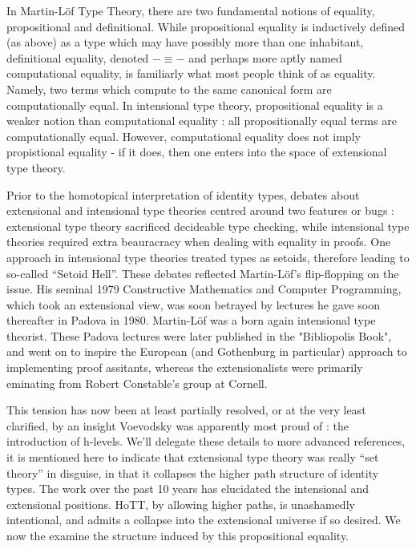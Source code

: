 In Martin-Löf Type Theory, there are two fundamental notions of equality,
propositional and definitional.  While propositional equality is inductively
defined (as above) as a type which may have possibly more than one inhabitant,
definitional equality, denoted $-\equiv -$ and perhaps more aptly named
computational equality, is familiarly what most people think of as equality.
Namely, two terms which compute to the same canonical form are computationally
equal. In intensional type theory, propositional equality is a weaker notion
than computational equality : all propositionally equal terms are
computationally equal. However, computational equality does not imply
propistional equality - if it does, then one enters into the space of
extensional type theory.

Prior to the homotopical interpretation of identity types, debates about
extensional and intensional type theories centred around two features or bugs :
extensional type theory sacrificed decideable type checking, while intensional
type theories required extra beauracracy when dealing with equality in proofs.
One approach in intensional type theories treated types as setoids, therefore
leading to so-called ``Setoid Hell''. These debates reflected Martin-Löf's
flip-flopping on the issue. His seminal 1979 Constructive Mathematics and
Computer Programming, which took an extensional view, was soon betrayed by
lectures he gave soon thereafter in Padova in 1980.  Martin-Löf was a born
again intensional type theorist.  These Padova lectures were later published in
the "Bibliopolis Book", and went on to inspire the European (and Gothenburg in
particular) approach to implementing proof assitants, whereas the
extensionalists were primarily eminating from Robert Constable's group at
Cornell.

This tension has now been at least partially resolved, or at the very least
clarified, by an insight Voevodsky was apparently most proud of : the
introduction of h-levels. We'll delegate these details to more advanced references, it
is mentioned here to indicate that extensional type theory was really ``set
theory'' in disguise, in that it collapses the higher path structure of
identity types. The work over the past 10 years has elucidated the intensional
and extensional positions. HoTT, by allowing higher paths, is unashamedly
intentional, and admits a collapse into the extensional universe if so desired.
We now the examine the structure induced by this propositional equality.
